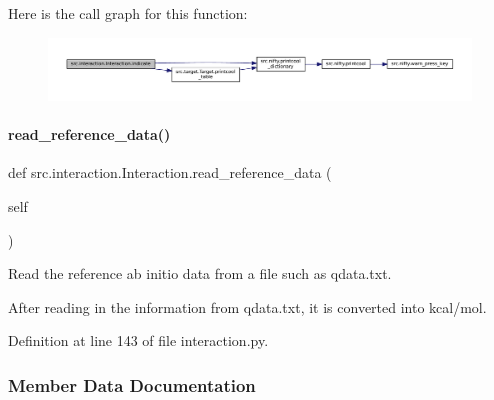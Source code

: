 Here is the call graph for this function\+:
\nopagebreak
\begin{figure}[H]
\begin{center}
\leavevmode
\includegraphics[width=350pt]{classsrc_1_1interaction_1_1Interaction_a701bc0f64d4ad094259c21a75d7addac_cgraph}
\end{center}
\end{figure}
\mbox{\label{classsrc_1_1interaction_1_1Interaction_aa48acb8e4fb977757bf194d363996b4e}} 
\paragraph{\texorpdfstring{read\+\_\+reference\+\_\+data()}{read\_reference\_data()}}
{\footnotesize\ttfamily def src.\+interaction.\+Interaction.\+read\+\_\+reference\+\_\+data (\begin{DoxyParamCaption}\item[{}]{self }\end{DoxyParamCaption})}



Read the reference ab initio data from a file such as qdata.\+txt. 

After reading in the information from qdata.\+txt, it is converted into kcal/mol. 

Definition at line 143 of file interaction.\+py.



\subsubsection{Member Data Documentation}
\mbox{\label{classsrc_1_1interaction_1_1Interaction_a98cbd2bf41947df173b9e68cfb22f843}} 
